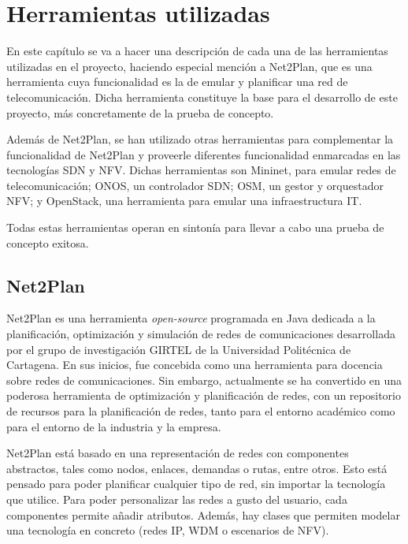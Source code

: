 \chapter{Herramientas utilizadas}

En este capítulo se va a hacer una descripción de cada una de las herramientas utilizadas en el proyecto, haciendo especial mención a Net2Plan, que es una herramienta cuya funcionalidad es la de emular y planificar una red de telecomunicación. Dicha herramienta constituye la base para el desarrollo de este proyecto, más concretamente de la prueba de concepto.

Además de Net2Plan, se han utilizado otras herramientas para complementar la funcionalidad de Net2Plan y proveerle diferentes funcionalidad enmarcadas en las tecnologías \ac{SDN} y \ac{NFV}. Dichas herramientas son Mininet, para emular redes de telecomunicación; ONOS, un controlador \ac{SDN}; \ac{OSM}, un gestor y orquestador \ac{NFV}; y OpenStack, una herramienta para emular una infraestructura IT.

Todas estas herramientas operan en sintonía para llevar a cabo una prueba de concepto exitosa.


\section{Net2Plan}
\label{sec:net2plan}

Net2Plan\cite{net2planbib} es una herramienta \textit{open-source} programada en Java dedicada a la planificación, optimización y simulación de redes de comunicaciones desarrollada por el grupo de investigación GIRTEL de la Universidad Politécnica de Cartagena. En sus inicios, fue concebida como una herramienta para docencia sobre redes de comunicaciones. Sin embargo, actualmente se ha convertido en una poderosa herramienta de optimización y planificación de redes, con un repositorio de recursos para la planificación de redes, tanto para el entorno académico como para el entorno de la industria y la empresa.

Net2Plan está basado en una representación de redes con componentes abstractos, tales como nodos, enlaces, demandas o rutas, entre otros. Esto está pensado para poder planificar cualquier tipo de red, sin importar la tecnología que utilice. Para poder personalizar las redes a gusto del usuario, cada componentes permite añadir atributos. Además, hay clases que permiten modelar una tecnología en concreto (redes \ac{IP}, \ac{WDM} o escenarios de \ac{NFV}).

